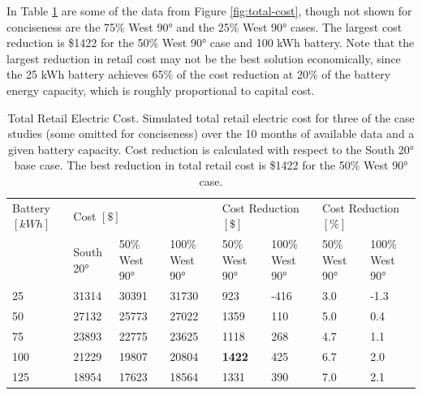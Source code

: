 \documentclass[journal,article,submit,pdftex,moreauthors]{Definitions/mdpi}
\begin{document}
In Table \ref{tab:total-cost} are some of the data from Figure \ref{fig:total-cost}, though not shown for conciseness are the 75\% West 90° and the 25\% West 90° cases. The largest cost reduction is \$1422 for the 50\% West 90° case and 100 kWh battery. Note that the largest reduction in retail cost may not be the best solution economically, since the 25 kWh battery achieves 65\% of the cost reduction at 20\% of the battery energy capacity, which is roughly proportional to capital cost.

\begin{table}[!h]
  \caption{Total Retail Electric Cost. Simulated total retail electric cost for three of the case studies (some omitted for conciseness) over the 10 months of available data and a given battery capacity. Cost reduction is calculated with respect to the South 20° base case. The best reduction in total retail cost is \$1422 for the 50\% West 90° case.}
  \label{tab:total-cost}
  \begin{tabularx}{\textwidth}{XXXXXXXX}
    \toprule
    Battery $[kWh]$ & \multicolumn{3}{l}{Cost $[\$]$} & \multicolumn{2}{l}{Cost Reduction $[\$]$} & \multicolumn{2}{l}{Cost Reduction $[\%]$}                                                                   \\
                    & South 20°                       & 50\% West 90°                             & 100\% West 90°                            & 50\% West 90° & 100\% West 90° & 50\% West 90° & 100\% West 90° \\
    \midrule
    25              & 31314                           & 30391                                     & 31730                                     & 923           & -416           & 3.0           & -1.3           \\
    50              & 27132                           & 25773                                     & 27022                                     & 1359          & 110            & 5.0           & 0.4            \\
    75              & 23893                           & 22775                                     & 23625                                     & 1118          & 268            & 4.7           & 1.1            \\
    100             & 21229                           & 19807                                     & 20804                                     & \textbf{1422} & 425            & 6.7           & 2.0            \\
    125             & 18954                           & 17623                                     & 18564                                     & 1331          & 390            & 7.0           & 2.1            \\

\end{tabularx}
\end{table}
\end{document}
